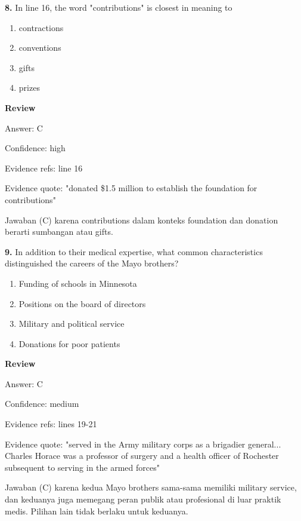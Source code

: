 \documentclass[12pt]{article}
\begin{document}
\endgroup
\par
\vspace{0.25\baselineskip}
\noindent\textbf{8.} In line 16, the word "contributions" is closest in meaning to
\begin{enumerate}[label=(\Alph*),leftmargin=*,itemsep=0.2em]
\item contractions
\item conventions
\item gifts
\item prizes
\end{enumerate}
\par
\begingroup
\setlength{\parskip}{0pt}
\setlength{\parindent}{0pt}
\textbf{Review}\par
Answer: C\par
Confidence: high\par
Evidence refs: line 16\par
Evidence quote: "donated \$1.5 million to establish the foundation for contributions"\par
Jawaban (C) karena contributions dalam konteks foundation dan donation berarti sumbangan atau gifts.\par
\endgroup
\par
\vspace{0.25\baselineskip}
\noindent\textbf{9.} In addition to their medical expertise, what common characteristics distinguished the careers of the Mayo brothers?
\begin{enumerate}[label=(\Alph*),leftmargin=*,itemsep=0.2em]
\item Funding of schools in Minnesota
\item Positions on the board of directors
\item Military and political service
\item Donations for poor patients
\end{enumerate}
\par
\begingroup
\setlength{\parskip}{0pt}
\setlength{\parindent}{0pt}
\textbf{Review}\par
Answer: C\par
Confidence: medium\par
Evidence refs: lines 19-21\par
Evidence quote: "served in the Army military corps as a brigadier general... Charles Horace was a professor of surgery and a health officer of Rochester subsequent to serving in the armed forces"\par
Jawaban (C) karena kedua Mayo brothers sama-sama memiliki military service, dan keduanya juga memegang peran publik atau profesional di luar praktik medis. Pilihan lain tidak berlaku untuk keduanya.\par
\end{document}
